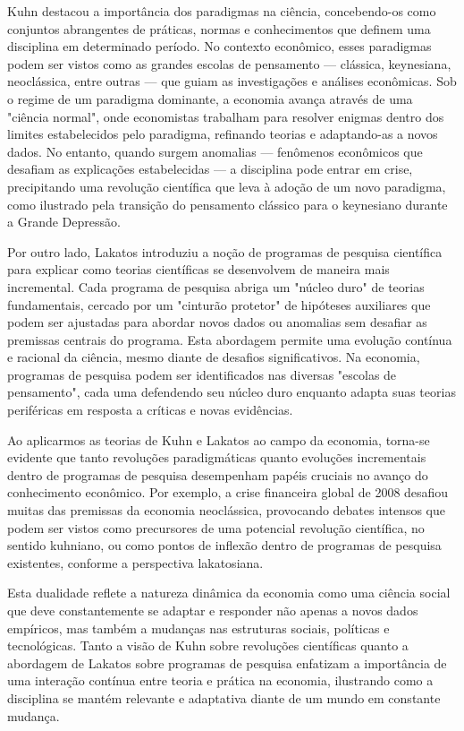 \documentclass[a4paper,12pt]{article}[abntex2]
\begin{document}
Kuhn destacou a importância dos paradigmas na ciência, concebendo-os como conjuntos abrangentes de práticas, normas e conhecimentos que definem uma disciplina em determinado período. No contexto econômico, esses paradigmas podem ser vistos como as grandes escolas de pensamento — clássica, keynesiana, neoclássica, entre outras — que guiam as investigações e análises econômicas. Sob o regime de um paradigma dominante, a economia avança através de uma "ciência normal", onde economistas trabalham para resolver enigmas dentro dos limites estabelecidos pelo paradigma, refinando teorias e adaptando-as a novos dados. No entanto, quando surgem anomalias — fenômenos econômicos que desafiam as explicações estabelecidas — a disciplina pode entrar em crise, precipitando uma revolução científica que leva à adoção de um novo paradigma, como ilustrado pela transição do pensamento clássico para o keynesiano durante a Grande Depressão.

Por outro lado, Lakatos introduziu a noção de programas de pesquisa científica para explicar como teorias científicas se desenvolvem de maneira mais incremental. Cada programa de pesquisa abriga um "núcleo duro" de teorias fundamentais, cercado por um "cinturão protetor" de hipóteses auxiliares que podem ser ajustadas para abordar novos dados ou anomalias sem desafiar as premissas centrais do programa. Esta abordagem permite uma evolução contínua e racional da ciência, mesmo diante de desafios significativos. Na economia, programas de pesquisa podem ser identificados nas diversas "escolas de pensamento", cada uma defendendo seu núcleo duro enquanto adapta suas teorias periféricas em resposta a críticas e novas evidências.

Ao aplicarmos as teorias de Kuhn e Lakatos ao campo da economia, torna-se evidente que tanto revoluções paradigmáticas quanto evoluções incrementais dentro de programas de pesquisa desempenham papéis cruciais no avanço do conhecimento econômico. Por exemplo, a crise financeira global de 2008 desafiou muitas das premissas da economia neoclássica, provocando debates intensos que podem ser vistos como precursores de uma potencial revolução científica, no sentido kuhniano, ou como pontos de inflexão dentro de programas de pesquisa existentes, conforme a perspectiva lakatosiana.

Esta dualidade reflete a natureza dinâmica da economia como uma ciência social que deve constantemente se adaptar e responder não apenas a novos dados empíricos, mas também a mudanças nas estruturas sociais, políticas e tecnológicas. Tanto a visão de Kuhn sobre revoluções científicas quanto a abordagem de Lakatos sobre programas de pesquisa enfatizam a importância de uma interação contínua entre teoria e prática na economia, ilustrando como a disciplina se mantém relevante e adaptativa diante de um mundo em constante mudança.
\end{document}
